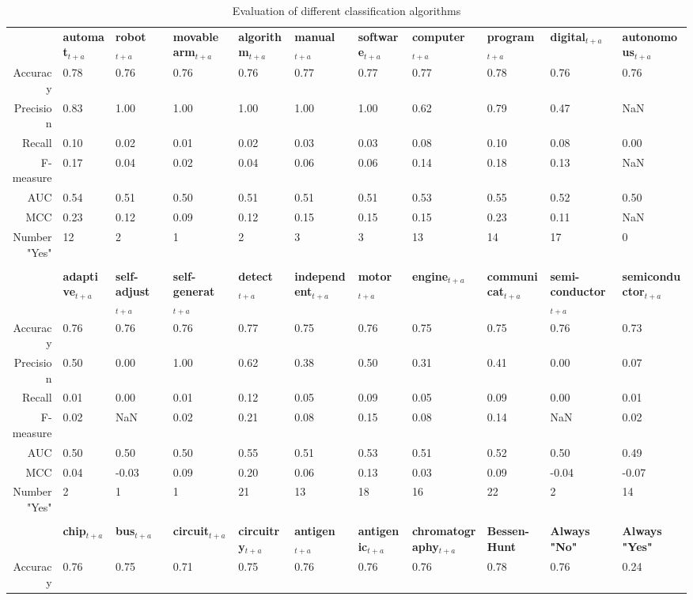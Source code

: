 \begin{table}
\begin{small}
\begin{threeparttable}
\caption{{\normalsize Evaluation of different classification algorithms}}
\label{table:table_compare_classalg}
\begin{tabular}{rllllllllll}
\toprule 
 & \textbf{automat$_{t+a}$} & \textbf{robot$_{t+a}$} & \textbf{movable arm$_{t+a}$} & \textbf{algorithm$_{t+a}$} & \textbf{manual$_{t+a}$} & \textbf{software$_{t+a}$} & \textbf{computer$_{t+a}$} & \textbf{program$_{t+a}$} & \textbf{digital$_{t+a}$} & \textbf{autonomous$_{t+a}$}  \tabularnewline 
Accuracy & 0.78 & 0.76 & 0.76 & 0.76 & 0.77 & 0.77 & 0.77 & 0.78 & 0.76 & 0.76  \tabularnewline 
Precision & 0.83 & 1.00 & 1.00 & 1.00 & 1.00 & 1.00 & 0.62 & 0.79 & 0.47 & NaN  \tabularnewline 
Recall & 0.10 & 0.02 & 0.01 & 0.02 & 0.03 & 0.03 & 0.08 & 0.10 & 0.08 & 0.00  \tabularnewline 
F-measure & 0.17 & 0.04 & 0.02 & 0.04 & 0.06 & 0.06 & 0.14 & 0.18 & 0.13 & NaN  \tabularnewline 
AUC & 0.54 & 0.51 & 0.50 & 0.51 & 0.51 & 0.51 & 0.53 & 0.55 & 0.52 & 0.50  \tabularnewline 
MCC & 0.23 & 0.12 & 0.09 & 0.12 & 0.15 & 0.15 & 0.15 & 0.23 & 0.11 & NaN  \tabularnewline 
Number "Yes" & 12 & 2 & 1 & 2 & 3 & 3 & 13 & 14 & 17 & 0  \tabularnewline 
\tabularnewline 
 & \textbf{adaptive$_{t+a}$} & \textbf{self-adjust$_{t+a}$} & \textbf{self-generat$_{t+a}$} & \textbf{detect$_{t+a}$} & \textbf{independent$_{t+a}$} & \textbf{motor$_{t+a}$} & \textbf{engine$_{t+a}$} & \textbf{communicat$_{t+a}$} & \textbf{semi-conductor$_{t+a}$} & \textbf{semiconductor$_{t+a}$}  \tabularnewline 
Accuracy & 0.76 & 0.76 & 0.76 & 0.77 & 0.75 & 0.76 & 0.75 & 0.75 & 0.76 & 0.73  \tabularnewline 
Precision & 0.50 & 0.00 & 1.00 & 0.62 & 0.38 & 0.50 & 0.31 & 0.41 & 0.00 & 0.07  \tabularnewline 
Recall & 0.01 & 0.00 & 0.01 & 0.12 & 0.05 & 0.09 & 0.05 & 0.09 & 0.00 & 0.01  \tabularnewline 
F-measure & 0.02 & NaN & 0.02 & 0.21 & 0.08 & 0.15 & 0.08 & 0.14 & NaN & 0.02  \tabularnewline 
AUC & 0.50 & 0.50 & 0.50 & 0.55 & 0.51 & 0.53 & 0.51 & 0.52 & 0.50 & 0.49  \tabularnewline 
MCC & 0.04 & -0.03 & 0.09 & 0.20 & 0.06 & 0.13 & 0.03 & 0.09 & -0.04 & -0.07  \tabularnewline 
Number "Yes" & 2 & 1 & 1 & 21 & 13 & 18 & 16 & 22 & 2 & 14  \tabularnewline 
\tabularnewline 
 & \textbf{chip$_{t+a}$} & \textbf{bus$_{t+a}$} & \textbf{circuit$_{t+a}$} & \textbf{circuitry$_{t+a}$} & \textbf{antigen$_{t+a}$} & \textbf{antigenic$_{t+a}$} & \textbf{chromatography$_{t+a}$} & \textbf{Bessen-Hunt} & \textbf{Always "No"} & \textbf{Always "Yes"}  \tabularnewline 
Accuracy & 0.76 & 0.75 & 0.71 & 0.75 & 0.76 & 0.76 & 0.76 & 0.78 & 0.76 & 0.24  \tabularnewline 

\end{tabular}
\end{threeparttable}
\end{small}
\end{table}
